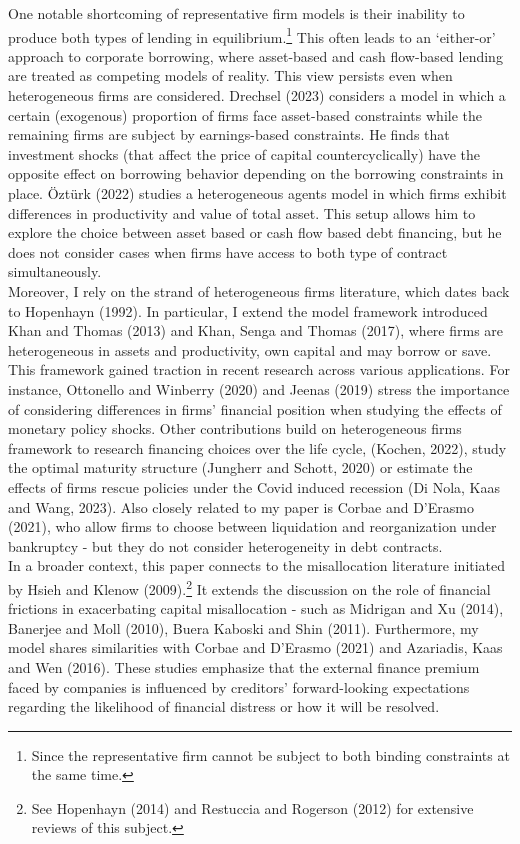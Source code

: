 \documentclass[12pt]{article}
\begin{document}
One notable shortcoming of representative firm models is their inability to produce both types of lending in equilibrium.\footnote{Since the representative firm cannot be subject to both binding constraints at the same time.} This often leads to an `either-or' approach to corporate borrowing, where asset-based and cash flow-based lending are treated as competing models of reality. This view persists even when heterogeneous firms are considered. Drechsel (2023) considers a model in which a certain (exogenous) proportion of firms face asset-based constraints while the remaining firms are subject by earnings-based constraints. He finds that investment shocks (that affect the price of capital countercyclically) have the opposite effect on borrowing behavior depending on the borrowing constraints in place. Öztürk (2022) studies a heterogeneous agents model in which firms exhibit differences in productivity and value of total asset. This setup allows him to explore the choice between asset based or cash flow based debt financing, but he does not consider cases when firms have access to both type of contract simultaneously. \vspace{3mm} \\ 
Moreover, I rely on the strand of heterogeneous firms literature, which dates back to Hopenhayn (1992). In particular, I extend the model framework introduced Khan and Thomas (2013) and Khan, Senga and Thomas (2017), where firms are heterogeneous in assets and productivity, own capital and may borrow or save. This framework gained traction in recent research across various applications. For instance, Ottonello and Winberry (2020) and Jeenas (2019) stress the importance of considering differences in firms' financial position when studying the effects of monetary policy shocks. Other contributions build on heterogeneous firms framework to research financing choices over the life cycle, (Kochen, 2022), study the optimal maturity structure (Jungherr and Schott, 2020) or estimate the effects of firms rescue policies under the Covid induced recession (Di Nola, Kaas and Wang, 2023). Also closely related to my paper is Corbae and D'Erasmo (2021), who allow firms to choose between liquidation and reorganization under bankruptcy - but they do not consider heterogeneity in debt contracts.  \vspace{3mm} \\
In a broader context, this paper connects to the misallocation literature initiated by Hsieh and Klenow (2009).\footnote{See Hopenhayn (2014) and Restuccia and Rogerson (2012) for extensive reviews of this subject.} It extends the discussion on the role of financial frictions in exacerbating capital misallocation - such as Midrigan and Xu (2014), Banerjee and Moll (2010), Buera Kaboski and Shin (2011). Furthermore, my model shares similarities with Corbae and D'Erasmo (2021) and Azariadis, Kaas and Wen (2016). These studies emphasize that the external finance premium faced by companies is influenced by creditors' forward-looking expectations regarding the likelihood of financial distress or how it will be resolved. 
\end{document}
